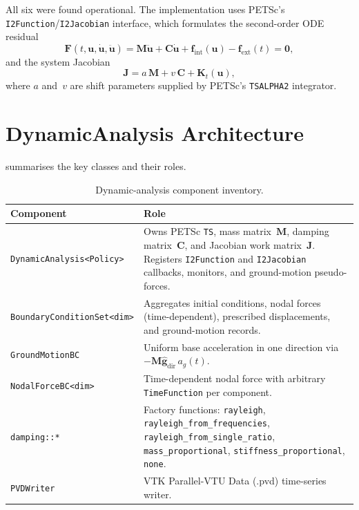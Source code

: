 All six were found operational.  The implementation uses PETSc's
\texttt{I2Function}/\texttt{I2Jacobian} interface, which formulates
the second-order ODE residual
\begin{equation}
  \mathbf{F}(t,\mathbf{u},\dot{\mathbf{u}},\ddot{\mathbf{u}})
  = \mathbf{M}\ddot{\mathbf{u}}
  + \mathbf{C}\dot{\mathbf{u}}
  + \mathbf{f}_\mathrm{int}(\mathbf{u})
  - \mathbf{f}_\mathrm{ext}(t)
  = \mathbf{0},
\end{equation}
and the system Jacobian
\begin{equation}
  \mathbf{J} = a\,\mathbf{M} + v\,\mathbf{C} + \mathbf{K}_t(\mathbf{u}),
\end{equation}
where $a$ and~$v$ are shift parameters supplied by PETSc's
\texttt{TSALPHA2} integrator.


\section{DynamicAnalysis Architecture}
\label{sec:phase5-architecture}

 summarises the key classes
and their roles.

\begin{table}[htbp]
\centering
\caption{Dynamic-analysis component inventory.}
\label{tab:phase5-architecture}
\begin{tabular}{lp{7.5cm}}
\toprule
Component & Role \\
\midrule
\texttt{DynamicAnalysis<Policy>}
  & Owns PETSc \texttt{TS}, mass matrix~$\mathbf{M}$,
    damping matrix~$\mathbf{C}$, and Jacobian work
    matrix~$\mathbf{J}$.  Registers \texttt{I2Function}
    and \texttt{I2Jacobian} callbacks, monitors, and
    ground-motion pseudo-forces. \\
\texttt{BoundaryConditionSet<dim>}
  & Aggregates initial conditions, nodal forces
    (time-dependent), prescribed displacements,
    and ground-motion records. \\
\texttt{GroundMotionBC}
  & Uniform base acceleration in one direction via
    $-\mathbf{M}\hat{\mathbf{g}}_\mathrm{dir}\,a_g(t)$. \\
\texttt{NodalForceBC<dim>}
  & Time-dependent nodal force with arbitrary
    \texttt{TimeFunction} per component. \\
\texttt{damping::*}
  & Factory functions: \texttt{rayleigh},
    \texttt{rayleigh\_from\_frequencies},
    \texttt{rayleigh\_from\_single\_ratio},
    \texttt{mass\_proportional},
    \texttt{stiffness\_proportional},
    \texttt{none}. \\
\texttt{PVDWriter}
  & VTK Parallel-VTU Data (.pvd) time-series writer. \\
\bottomrule
\end{tabular}
\end{table}

